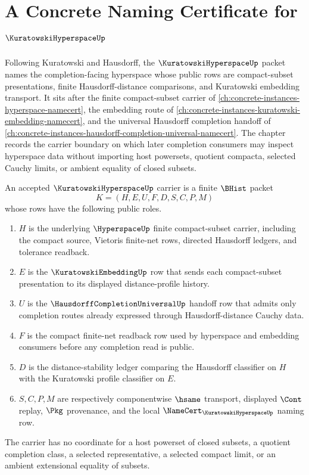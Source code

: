 \chapter{A Concrete Naming Certificate for $\KuratowskiHyperspaceUp$}
\label{ch:concrete-instances-kuratowski-hyperspace-namecert}

Following Kuratowski and Hausdorff, the $\KuratowskiHyperspaceUp$ packet names the completion-facing hyperspace whose public rows are compact-subset presentations, finite Hausdorff-distance comparisons, and Kuratowski embedding transport. It sits after the finite compact-subset carrier of \autoref{ch:concrete-instances-hyperspace-namecert}, the embedding route of \autoref{ch:concrete-instances-kuratowski-embedding-namecert}, and the universal Hausdorff completion handoff of \autoref{ch:concrete-instances-hausdorff-completion-universal-namecert}. The chapter records the carrier boundary on which later completion consumers may inspect hyperspace data without importing host powersets, quotient compacta, selected Cauchy limits, or ambient equality of closed subsets.

\begin{definition}
\label{def:kuratowski-hyperspace-carrier}
An accepted $\KuratowskiHyperspaceUp$ carrier is a finite $\BHist$ packet
$$
K=(H,E,U,F,D,S,C,P,M)
$$
whose rows have the following public roles.
\begin{enumerate}
\item $H$ is the underlying $\HyperspaceUp$ finite compact-subset carrier, including the compact source, Vietoris finite-net rows, directed Hausdorff ledgers, and tolerance readback.
\item $E$ is the $\KuratowskiEmbeddingUp$ row that sends each compact-subset presentation to its displayed distance-profile history.
\item $U$ is the $\HausdorffCompletionUniversalUp$ handoff row that admits only completion routes already expressed through Hausdorff-distance Cauchy data.
\item $F$ is the compact finite-net readback row used by hyperspace and embedding consumers before any completion read is public.
\item $D$ is the distance-stability ledger comparing the Hausdorff classifier on $H$ with the Kuratowski profile classifier on $E$.
\item $S,C,P,M$ are respectively componentwise $\hsame$ transport, displayed $\Cont$ replay, $\Pkg$ provenance, and the local $\NameCert_{\KuratowskiHyperspaceUp}$ naming row.
\end{enumerate}
The carrier has no coordinate for a host powerset of closed subsets, a quotient completion class, a selected representative, a selected compact limit, or an ambient extensional equality of subsets.
\end{definition}

